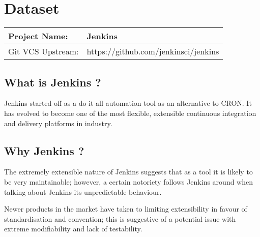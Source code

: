 \section{Dataset}


\begin{table}[H]
	\begin{tabular}{ | l |  l |}
		\hline
		Project Name: & Jenkins \\ 
		\hline
		Git VCS Upstream: & https://github.com/jenkinsci/jenkins\\
		\hline
	\end{tabular}
\end{table}


\subsection{What is Jenkins ?}

Jenkins started off as a do-it-all automation tool as an alternative to CRON. It has evolved to become one of the most flexible, extensible continuous integration and delivery platforms in industry.

\subsection{Why Jenkins ?}

The extremely extensible nature of Jenkins suggests that as a tool it is likely to be very maintainable; however, a certain notoriety follows Jenkins around when talking about Jenkins its unpredictable behaviour. 

Newer products in the market have taken to limiting extensibility in favour of standardisation and convention; this is suggestive of a potential issue with extreme modifiability and lack of testability.